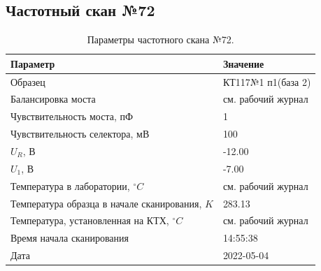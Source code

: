 \subsection{Частотный скан №72}
\begin{table}[!ht]
    \centering
    \caption{Параметры частотного скана №72.}
    \begin{tabular}{|l|l|}
        \hline
        Параметр                                       & Значение                  \\ \hline
        Образец                                        & КТ117№1 п1(база 2)        \\ \hline
        Балансировка моста                             & см. рабочий журнал        \\ \hline
        Чувствительность моста, пФ                     & 1                         \\ \hline
        Чувствительность селектора, мВ                 & 100                       \\ \hline
        $U_R$, В                                       & -12.00                    \\ \hline
        $U_1$, В                                       & -7.00                     \\ \hline
        Температура в лаборатории, $^\circ C$          & см. рабочий журнал        \\ \hline
        Температура образца в начале сканирования, $K$ & 283.13                    \\ \hline
        Температура, установленная на КТХ, $^\circ C$  & см. рабочий журнал        \\ \hline
        Время начала сканирования                      & 14:55:38                  \\ \hline
        Дата                                           & 2022-05-04                \\ \hline
    \end{tabular}
    \label{table:frequency_scan_72}
\end{table}

